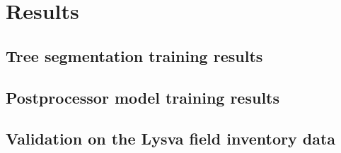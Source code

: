 \chapter{Results}\label{cap:results}

\section{Tree segmentation training results}

\section{Postprocessor model training results}

\section{Validation on the Lysva field inventory data}

